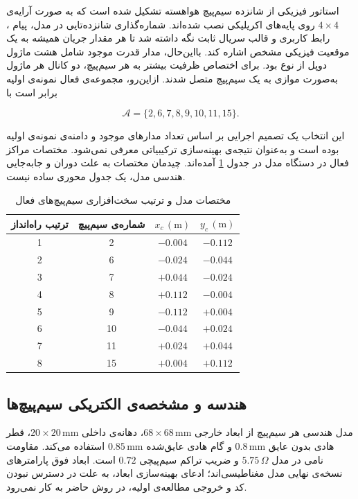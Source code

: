 استاتور فیزیکی از شانزده سیم‌پیچ هواهسته تشکیل شده است که به صورت آرایه‌ی $4\times4$ روی پایه‌های اکریلیکی نصب شده‌اند. شماره‌گذاری شانزده‌تایی در مدل، پیام ، رابط کاربری و قالب سریال ثابت نگه داشته شد تا هر مقدار جریان همیشه به یک موقعیت فیزیکی مشخص اشاره کند. بااین‌حال، مدار قدرت موجود شامل هشت ماژول دوپل  از نوع  بود. برای اختصاص ظرفیت بیشتر به هر سیم‌پیچ، دو کانال هر ماژول به‌صورت موازی به یک سیم‌پیچ متصل شدند. ازاین‌رو، مجموعه‌ی فعال نمونه‌ی اولیه برابر است با

\begin{equation}
	\mathcal A=\{2,6,7,8,9,10,11,15\}.
	\label{eq:method-active-coils}
\end{equation}

این انتخاب یک تصمیم اجرایی بر اساس تعداد مدارهای موجود و دامنه‌ی نمونه‌ی اولیه بوده است و به‌عنوان نتیجه‌ی بهینه‌سازی ترکیبیاتی معرفی نمی‌شود. مختصات مراکز فعال در دستگاه مدل در جدول \ref{tab:method-active-coordinates} آمده‌اند. چیدمان مختصات به علت دوران و جابه‌جایی هندسی مدل، یک جدول محوری ساده نیست.

\begin{table}[htbp]
	\centering
	\caption{مختصات مدل و ترتیب سخت‌افزاری سیم‌پیچ‌های فعال}
	\label{tab:method-active-coordinates}
	\begin{tabular}{|c|c|c|c|}
		\hline
		\textbf{ترتیب راه‌انداز} & \textbf{شماره‌ی سیم‌پیچ} & $x_c\,(\mathrm m)$ & $y_c\,(\mathrm m)$\\ \hline
		1&2&$-0.004$&$-0.112$\\ \hline
		2&6&$-0.024$&$-0.044$\\ \hline
		3&7&$+0.044$&$-0.024$\\ \hline
		4&8&$+0.112$&$-0.004$\\ \hline
		5&9&$-0.112$&$+0.004$\\ \hline
		6&10&$-0.044$&$+0.024$\\ \hline
		7&11&$+0.024$&$+0.044$\\ \hline
		8&15&$+0.004$&$+0.112$\\ \hline
	\end{tabular}
\end{table}

\subsection{هندسه و مشخصه‌ی الکتریکی سیم‌پیچ‌ها}

مدل هندسی هر سیم‌پیچ از ابعاد خارجی $68\times68\,\mathrm{mm}$، دهانه‌ی داخلی $20\times20\,\mathrm{mm}$، قطر هادی بدون عایق $0.8\,\mathrm{mm}$ و گام هادی عایق‌شده $0.85\,\mathrm{mm}$ استفاده می‌کند. مقاومت نامی در مدل $5.75\,\Omega$ و ضریب تراکم سیم‌پیچی $0.72$ است. ابعاد فوق پارامترهای نسخه‌ی نهایی مدل مغناطیسی‌اند؛ ادعای بهینه‌سازی ابعاد، به علت در دسترس نبودن کد و خروجی مطالعه‌ی اولیه، در روش حاضر به کار نمی‌رود.

